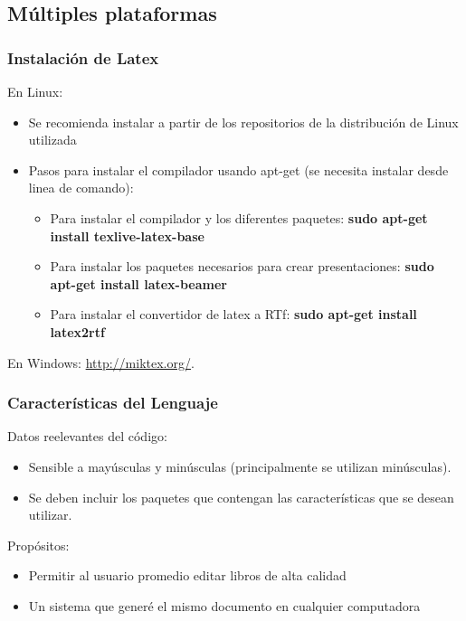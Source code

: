 \documentclass[aspectratio=169,compress]{beamer}
\begin{document}
\subsection{Múltiples plataformas}
  \frame
  {
    \frametitle{Instalación de Latex}
    En Linux:
    \begin{itemize}
	\item Se recomienda instalar a partir de los repositorios de la distribución de Linux utilizada
	\item Pasos para instalar el compilador usando apt-get (se necesita instalar desde linea de comando):
	    \begin{itemize}
		\item Para instalar el compilador y los diferentes paquetes: \textbf{sudo apt-get install texlive-latex-base}
		\item Para instalar los paquetes necesarios para crear presentaciones: \textbf{sudo apt-get install latex-beamer}
		\item Para instalar el convertidor de latex a RTf: \textbf{sudo apt-get install latex2rtf}
	    \end{itemize}
    \end{itemize}
    En Windows: \url{http://miktex.org/}. 

  }

  \frame
  {
    \frametitle{Características del Lenguaje}
    Datos reelevantes del código:
    \begin{itemize}
	\item Sensible a mayúsculas y minúsculas (principalmente se utilizan minúsculas).
	\item Se deben incluir los paquetes que contengan las características que se desean utilizar.
    \end{itemize}
    Propósitos:
    \begin{itemize}
	\item Permitir al usuario promedio editar libros de alta calidad
	\item Un sistema que generé el mismo documento en cualquier computadora
    \end{itemize}	
  }



\end{document}
